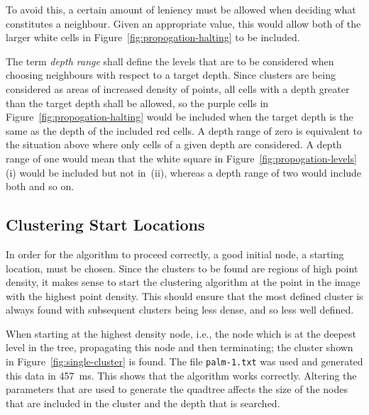 To avoid this, a certain amount of leniency must be allowed when deciding what
constitutes a neighbour. Given an appropriate value, this would allow both of
the larger white cells in Figure~\ref{fig:propogation-halting} to be included.

The term \emph{depth range} shall define the levels that are to be considered
when choosing neighbours with respect to a target depth. Since clusters are
being considered as areas of increased density of points, all cells with a
depth greater than the target depth shall be allowed, so the purple cells in
Figure~\ref{fig:propogation-halting} would be included when the target depth is
the same as the depth of the included red cells. A depth range of zero is
equivalent to the situation above where only cells of a given depth are
considered. A depth range of one would mean that the white square in
Figure~\ref{fig:propogation-levels}\,(i) would be included but not in~(ii),
whereas a depth range of two would include both and so on.

\subsection{Clustering Start Locations}
\label{sub:clustering_start_locations}

In order for the algorithm to proceed correctly, a good initial node, a
starting location, must be chosen. Since the clusters to be found are regions
of high point density, it makes sense to start the clustering algorithm at the
point in the image with the highest point density. This should ensure that the
most defined cluster is always found with subsequent clusters being less dense,
and so less well defined.

When starting at the highest density node, i.e., the node which is at the
deepest level in the tree, propagating this node and then terminating; the
cluster shown in Figure~\ref{fig:single-cluster} is found. The file
\texttt{palm-1.txt} was used and generated this data in
\SI{457}{\milli\second}. This shows that the algorithm works correctly.
Altering the parameters that are used to generate the quadtree affects the size
of the nodes that are included in the cluster and the depth that is searched.

